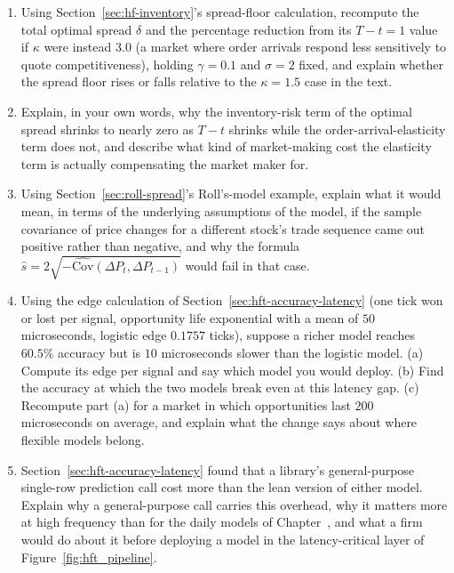 \documentclass[../ai_in_finance]{subfiles}
\begin{document}
\begin{enumerate}[exercises]
    \item Using Section~\ref{sec:hf-inventory}'s spread-floor calculation, recompute the total optimal spread $\delta$ and the percentage reduction from its $T-t=1$ value if $\kappa$ were instead $3.0$ (a market where order arrivals respond less sensitively to quote competitiveness), holding $\gamma=0.1$ and $\sigma=2$ fixed, and explain whether the spread floor rises or falls relative to the $\kappa=1.5$ case in the text.
    \item Explain, in your own words, why the inventory-risk term of the optimal spread shrinks to nearly zero as $T-t$ shrinks while the order-arrival-elasticity term does not, and describe what kind of market-making cost the elasticity term is actually compensating the market maker for.
    \item Using Section~\ref{sec:roll-spread}'s Roll's-model example, explain what it would mean, in terms of the underlying assumptions of the model, if the sample covariance of price changes for a different stock's trade sequence came out positive rather than negative, and why the formula $\hat s = 2\sqrt{-\widehat{\text{Cov}}(\Delta P_t,\Delta P_{t-1})}$ would fail in that case.
    \item Using the edge calculation of Section~\ref{sec:hft-accuracy-latency} (one tick won or lost per signal, opportunity life exponential with a mean of $50$ microseconds, logistic edge $0.1757$ ticks), suppose a richer model reaches $60.5\%$ accuracy but is $10$ microseconds slower than the logistic model. (a) Compute its edge per signal and say which model you would deploy. (b) Find the accuracy at which the two models break even at this latency gap. (c) Recompute part (a) for a market in which opportunities last $200$ microseconds on average, and explain what the change says about where flexible models belong.
    \item Section~\ref{sec:hft-accuracy-latency} found that a library's general-purpose single-row prediction call cost more than the lean version of either model. Explain why a general-purpose call carries this overhead, why it matters more at high frequency than for the daily models of Chapter~, and what a firm would do about it before deploying a model in the latency-critical layer of Figure~\ref{fig:hft_pipeline}.

\end{enumerate}
\end{document}
